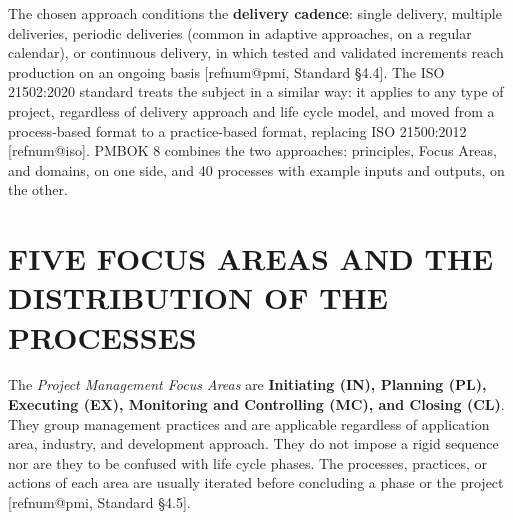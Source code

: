 \documentclass[12pt,a4paper,article,oneside,brazil,english]{abntex2}
\makeatletter
\newcommand{\refnum}[1]{\csname refnum@#1\endcsname}
\makeatother
\begin{document}
The chosen approach conditions the \textbf{delivery cadence}: single delivery, multiple deliveries, periodic deliveries (common in adaptive approaches, on a regular calendar), or continuous delivery, in which tested and validated increments reach production on an ongoing basis [\refnum{pmi}, Standard §4.4]. The ISO 21502:2020 standard treats the subject in a similar way: it applies to any type of project, regardless of delivery approach and life cycle model, and moved from a process-based format to a practice-based format, replacing ISO 21500:2012 [\refnum{iso}]. PMBOK 8 combines the two approaches: principles, Focus Areas, and domains, on one side, and 40 processes with example inputs and outputs, on the other.

\section{FIVE FOCUS AREAS AND THE DISTRIBUTION OF THE PROCESSES}

The \textit{Project Management Focus Areas} are \textbf{Initiating (IN), Planning (PL), Executing (EX), Monitoring and Controlling (MC), and Closing (CL)}. They group management practices and are applicable regardless of application area, industry, and development approach. They do not impose a rigid sequence nor are they to be confused with life cycle phases. The processes, practices, or actions of each area are usually iterated before concluding a phase or the project [\refnum{pmi}, Standard §4.5].
\end{document}

